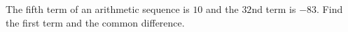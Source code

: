 The fifth term of an arithmetic sequence is $10$ and the $32$nd term is $-83$. Find the first term and the common difference.
